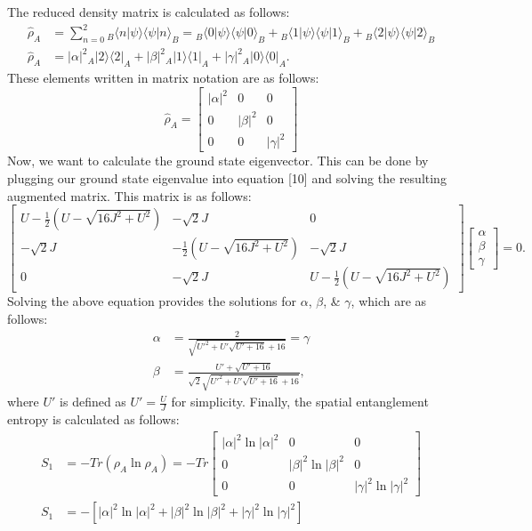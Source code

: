 \noindent The reduced density matrix is calculated as follows:
\begin{align}
\hat{\rho}_A &= \sum_{n=0}^{2}{{}_B \langle n | \psi \rangle \langle \psi | n \rangle_B} = {}_B \langle 0 | \psi \rangle \langle \psi | 0 \rangle_B + {}_B \langle 1 | \psi \rangle \langle \psi | 1 \rangle_B + {}_B \langle 2 | \psi \rangle \langle \psi | 2 \rangle_B \\
\hat{\rho}_A &=|\alpha|^2 {}_A |2\rangle\langle2|_A + |\beta|^2 {}_A |1\rangle\langle1|_A + |\gamma|^2 {}_A |0\rangle\langle0|_A.
\end{align}
\noindent These elements written in matrix notation are as follows:
\begin{equation}
\hat{\rho}_A = \begin{bmatrix} |\alpha|^2 & 0 & 0 \\ 0 & |\beta|^2 & 0 \\ 0 & 0 & |\gamma|^2 \end{bmatrix}
\end{equation}
\noindent Now, we want to calculate the ground state eigenvector. This can be done by plugging our ground state eigenvalue into equation [10] and solving the resulting augmented matrix. This matrix is as follows:
\begin{equation}
\begin{bmatrix} U - \frac{1}{2} \left( U - \sqrt{16J^2 + U^2} \right) & -\sqrt{2}J & 0 \\ -\sqrt{2}J & -\frac{1}{2} \left( U - \sqrt{16J^2 + U^2} \right) & -\sqrt{2}J \\ 0 & -\sqrt{2}J & U - \frac{1}{2} \left( U - \sqrt{16J^2 + U^2} \right) \end{bmatrix} \begin{bmatrix} \alpha \\ \beta \\ \gamma \end{bmatrix} = 0.
\end{equation}
\noindent Solving the above equation provides the solutions for $\alpha$, $\beta$, \& $\gamma$, which are as follows:
\begin{align*}
\alpha &= \frac{2}{\sqrt{ U'^2 + U' \sqrt{U' + 16} + 16}} = \gamma \\
\beta &= \frac{U' + \sqrt{U' + 16}}{\sqrt{2}\sqrt{U'^2 + U' \sqrt{U' + 16} + 16}},
\end{align*}
\noindent where $U'$ is defined as $U' = \frac{U}{J}$ for simplicity. Finally, the spatial entanglement entropy is calculated as follows:
\begin{align}
S_1 &= -Tr \left( \rho_A \ln{\rho_A} \right) = -Tr \begin{bmatrix} |\alpha|^2 \ln{|\alpha|^2} & 0 & 0 \\ 0 & |\beta|^2 \ln{|\beta|^2} & 0 \\ 0 & 0 & |\gamma|^2 \ln{|\gamma|^2} \end{bmatrix} \\
S_1 &= -\left[ |\alpha|^2 \ln{|\alpha|^2} + |\beta|^2 \ln{|\beta|^2} + |\gamma|^2 \ln{|\gamma|^2} \right]
\end{align}
